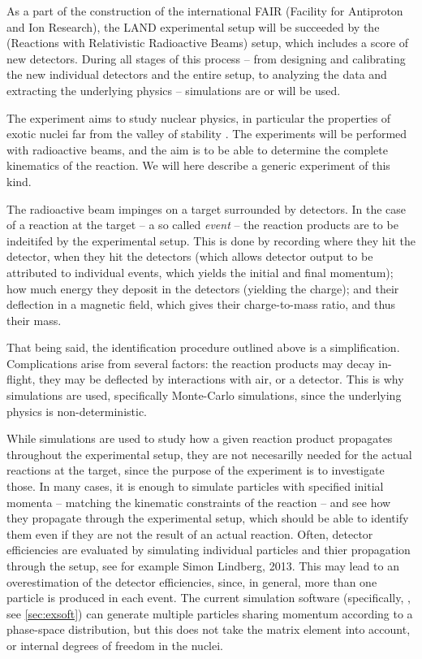 As a part of the construction of the international FAIR (Facility for Antiproton and Ion Research), the LAND experimental setup will be succeeded by the \rtb{} (Reactions with Relativistic Radioactive Beams) setup, which includes a score of new detectors. During all stages of this process -- from designing and calibrating the new individual detectors and the entire setup, to analyzing the data and extracting the underlying physics -- simulations are or will be used. 

The \rtb{} experiment aims to study nuclear physics, in particular the properties of exotic nuclei far from the valley of stability \cite{r3b:online}. The experiments will be performed with radioactive beams, and the aim is to be able to determine the complete kinematics of the reaction. We will here describe a generic experiment of this kind.

The radioactive beam impinges on a target surrounded by detectors. In the case of a reaction at the target -- a so called \emph{event} -- the reaction products are to be indeitifed by the experimental setup. 
This is done by recording where they hit the detector, when they hit the detectors (which allows detector output to be attributed to individual events, which yields the initial and final momentum); how much energy they deposit in the detectors (yielding the charge); and their deflection in a magnetic field, which gives their charge-to-mass ratio, and thus their mass. 

That being said, the identification procedure outlined above is a simplification. Complications arise from several factors: the reaction products may decay in-flight, they may be deflected by interactions with air, or a detector. This is why simulations are used, specifically Monte-Carlo simulations, since the underlying physics is non-deterministic. 

While simulations are used to study how a given reaction product propagates throughout the experimental setup, they are not necesarilly needed for the actual reactions at the target, since the purpose of the experiment is to investigate those. 
In many cases, it is enough to simulate particles with specified initial momenta -- matching the kinematic constraints of the reaction -- and see how they propagate through the experimental setup, which should be able to identify them even if they are not the result of an actual reaction.
Often, detector efficiencies are evaluated by simulating individual particles and thier propagation through the setup, see for example Simon Lindberg, 2013\cite{simon:2013:thesis}. This may lead to an overestimation of the detector efficiencies, since, in general, more than one particle is produced in each event. The current simulation software (specifically, \cite{johansson:2013:online}, see \autoref{sec:exsoft}) can generate multiple particles sharing momentum according to a phase-space distribution, but this does not take the matrix element into account, or internal degrees of freedom in the nuclei.

